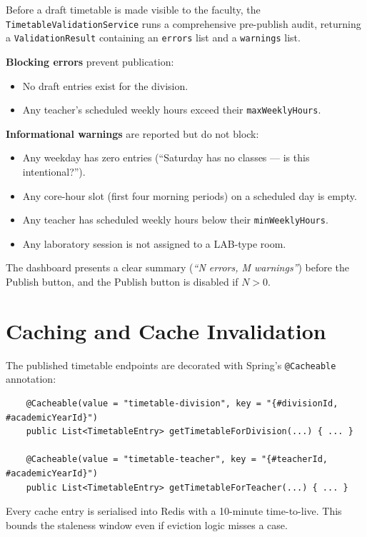 Before a draft timetable is made visible to the faculty, the \texttt{TimetableValidationService} runs a comprehensive pre-publish audit, returning a \texttt{ValidationResult} containing an \texttt{errors} list and a \texttt{warnings} list.

\textbf{Blocking errors} prevent publication:
\begin{itemize}
    \item No draft entries exist for the division.
    \item Any teacher's scheduled weekly hours exceed their \texttt{maxWeeklyHours}.
\end{itemize}

\textbf{Informational warnings} are reported but do not block:
\begin{itemize}
    \item Any weekday has zero entries (``Saturday has no classes --- is this intentional?'').
    \item Any core-hour slot (first four morning periods) on a scheduled day is empty.
    \item Any teacher has scheduled weekly hours below their \texttt{minWeeklyHours}.
    \item Any laboratory session is not assigned to a LAB-type room.
\end{itemize}

The dashboard presents a clear summary (\textit{``N errors, M warnings''}) before the Publish button, and the Publish button is disabled if $N > 0$.

\section{Caching and Cache Invalidation}

The published timetable endpoints are decorated with Spring's \texttt{@Cacheable} annotation:

\begin{verbatim}
    @Cacheable(value = "timetable-division", key = "{#divisionId, #academicYearId}")
    public List<TimetableEntry> getTimetableForDivision(...) { ... }

    @Cacheable(value = "timetable-teacher", key = "{#teacherId, #academicYearId}")
    public List<TimetableEntry> getTimetableForTeacher(...) { ... }
\end{verbatim}

Every cache entry is serialised into Redis with a 10-minute time-to-live. This bounds the staleness window even if eviction logic misses a case.

